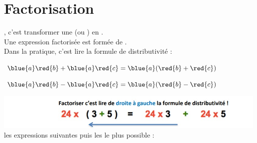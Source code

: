 \section{Factorisation}

\begin{Definition}
    , c’est transformer une  (ou ) en .\\
    Une expression factorisée est formée de .\\
    Dans la pratique,  c’est lire la formule de distributivité  : \\
    \begin{minipage}[t]{0.475\textwidth}
        \begin{center}\Large$\blue{a}\red{b}+\blue{a}\red{c}=\blue{a}(\red{b}+\red{c})$\end{center}
    \end{minipage}
    \hfill
    \begin{minipage}[t]{0.475\textwidth}
        \begin{center}\Large$\blue{a}\red{b}-\blue{a}\red{c}=\blue{a}(\red{b}-\red{c})$\end{center}
    \end{minipage} 
\end{Definition}

\begin{Exemple}
    \bclampe \includegraphics[]{images/Factorisation.jpg}
     les expressions suivantes puis les  le plus possible :\\
\end{Exemple}

